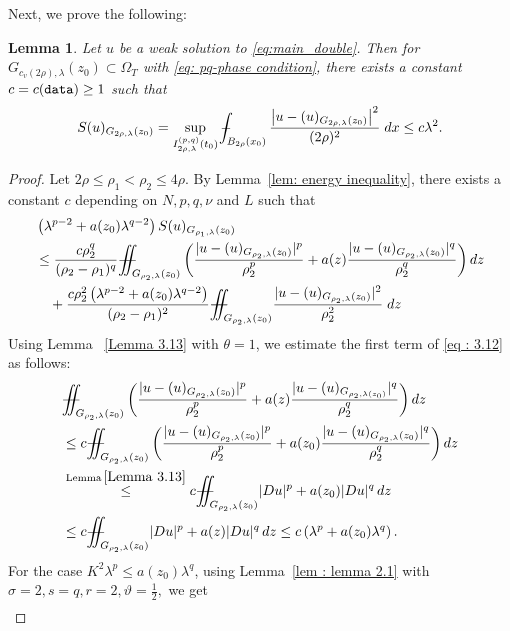 \documentclass[notitlepage,11pt,reqno]{amsart}
\newtheorem{lemma}[theorem]{Lemma}
\theoremstyle{definition}
\numberwithin{equation}{section}
\newcommand{\iintss}{{\int\hspace{-0.28cm}\int}}
\newcommand{ \miints }{{\iintss\hspace{-0.56cm} -\hspace{-0.15cm}-}}
\newcommand{\miint}[1]{{\miints_{\hspace{-0.13cm}#1}}}
\def\Xint#1{\mathchoice
	{\XXint\displaystyle\textstyle{#1}}%
	{\XXint\textstyle\scriptstyle{#1}}%
	{\XXint\scriptstyle\scriptscriptstyle{#1}}%
	{\XXint\scriptscriptstyle\scriptscriptstyle{#1}}%
	\!\int}
\def\XXint#1#2#3{{\setbox0=\hbox{$#1{#2#3}{\int}$}
		\vcenter{\hbox{$#2#3$}}\kern-.50\wd0}}
\def\Xint#1{\mathchoice
	{\XXint\displaystyle\textstyle{#1}}%
	{\XXint\textstyle\scriptstyle{#1}}%
	{\XXint\scriptstyle\scriptscriptstyle{#1}}%
	{\XXint\scriptscriptstyle\scriptscriptstyle{#1}}%
	\!\int}
\def\XXint#1#2#3{{\setbox0=\hbox{$#1{#2#3}{\int}$}
		\vcenter{\hbox{$#2#3$}}\kern-.50\wd0}}
\def\dashint{\Xint-}
\begin{document}
Next, we prove the following:
\begin{lemma}\label{Lemma 3.14}
Let $u$ be a weak solution to \eqref{eq:main_double}. Then for $G_{c_v(2 \rho),\lambda}(z_0) \subset \Omega_T$ with \eqref{eq: pq-phase condition}, there exists a constant $c=c(\textnormal{\texttt{data}}) \geq 1$ such that
\begin{align*}
S(u)_{G_{2\rho, \lambda}(z_0)}=\sup _{I^{(p,q)}_{2 \rho,\lambda}(t_0)} \dashint_{B_{2 \rho}(x_0)} \frac{\left|u-(u)_{G_{2 \rho,\lambda}(z_0)}\right|^2}{(2 \rho)^2}\; dx \leq c \lambda^2 .
\end{align*}
\end{lemma}
\begin{proof}
Let $2\rho \leq \rho_1<\rho_2 \leq 4\rho$. By Lemma~\ref{lem: energy inequality}, there exists a constant $c$ depending on $N,p,q,\nu$ and $L$ such that 
\begin{align}\label{eq : 3.12}
&\left(\lambda^{p-2}+a(z_0)\lambda^{q-2}\right)S(u)_{G_{\rho_1, \lambda}(z_0)}\nonumber\\
&\leq \frac{c\rho_2^q}{(\rho_2-\rho_1)^q}\miint{G_{\rho_2,\lambda}(z_0)}\left( \frac{|u-(u)_{G_{\rho_2,\lambda}(z_0)}|^p}{\rho^p_2}+a(z)\frac{|u-(u)_{G_{\rho_2,\lambda}(z_0)}|^q}{\rho^q_2} \right) dz \nonumber\\
&\quad + \frac{c\rho_2^2 \left(\lambda^{p-2}+a(z_0)\lambda^{q-2}\right)}{(\rho_2-\rho_1)^2}\miint{G_{\rho_2,\lambda}(z_0)}\frac{|u-(u)_{G_{\rho_2,\lambda}(z_0)}|^2}{\rho_2^2}\; dz
\end{align}
Using Lemma ~\ref{Lemma 3.13} with $\theta =1$, we estimate the first term of \eqref{eq : 3.12} as follows:
\begin{align*}
 &\miint{G_{\rho_2,\lambda}(z_0)}\left( \frac{|u-(u)_{G_{\rho_2,\lambda}(z_0)}|^p}{\rho^p_2}+a(z)\frac{|u-(u)_{G_{\rho_2,\lambda(z_0)}}|^q}{\rho^q_2} \right) dz\\
 &\leq c\miint{G_{\rho_2,\lambda}(z_0)} \left(\frac{|u-(u)_{G_{\rho_2,\lambda}(z_0)}|^p}{\rho^p_2}+a(z_0)\frac{|u-(u)_{G_{\rho_2,\lambda}(z_0)}|^q}{\rho^q_2} \right) dz\\
 &\overset{\text{Lemma}\,\ref{Lemma 3.13}}{\leq} c\miint{G_{\rho_2,\lambda}(z_0)}|Du|^p+a(z_0)|Du|^q\,dz\\
 &\leq c \miint{G_{\rho_2,\lambda}(z_0)}|Du|^p+a(z)|Du|^q\,dz\leq c\left(\lambda^p+a(z_0)\lambda^q\right).
\end{align*}
For the case $K^2\lambda^p\leq a(z_0)\lambda^q$,  using Lemma~\ref{lem : lemma 2.1} with $\sigma =2, s=q, r=2, \vartheta=\frac{1}{2},$ we get
\begin{align*}

\end{align*}
\end{proof}
\end{document}
